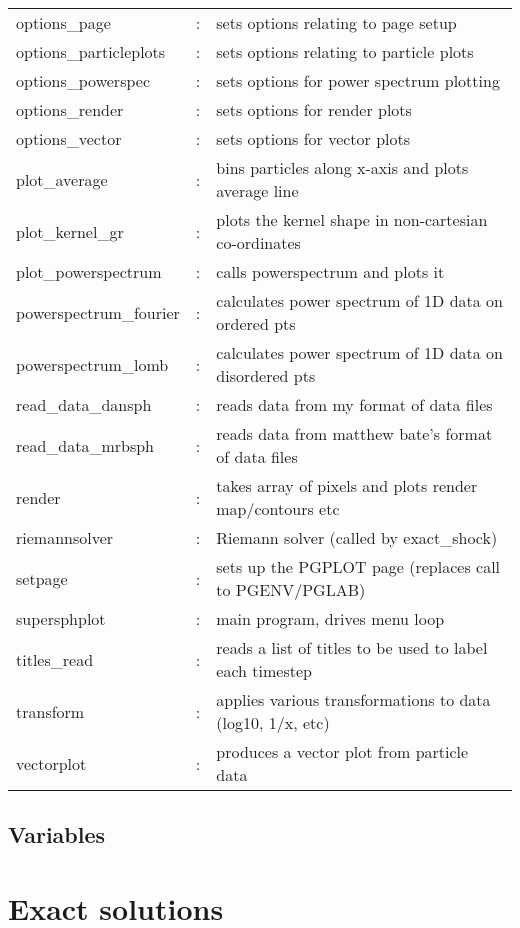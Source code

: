 \documentclass[a4paper,12pt]{article}
\begin{document}
\begin{longtable}{|lcp{}|}
options\_page       & : & sets options relating to page setup\\
options\_particleplots & : & sets options relating to particle plots\\
options\_powerspec  & : & sets options for power spectrum plotting\\
options\_render	 & : & sets options for render plots\\
options\_vector	 & : & sets options for vector plots\\
plot\_average	 & : & bins particles along x-axis and plots average line\\
plot\_kernel\_gr     & : & plots the kernel shape in non-cartesian co-ordinates\\
plot\_powerspectrum & : & calls powerspectrum and plots it\\
powerspectrum\_fourier & : & calculates power spectrum of 1D data on ordered pts\\
powerspectrum\_lomb & : & calculates power spectrum of 1D data on disordered pts\\
read\_data\_dansph   & : & reads data from my format of data files\\
read\_data\_mrbsph   & : & reads data from matthew bate's format of data files\\
render	 	 & : & takes array of pixels and plots render map/contours etc\\
riemannsolver      & : & Riemann solver (called by exact\_shock)\\
setpage            & : & sets up the PGPLOT page (replaces call to PGENV/PGLAB)\\
supersphplot	 & : & main program, drives menu loop\\
titles\_read        & : & reads a list of titles to be used to label each timestep\\
transform	 	 & : & applies various transformations to data (log10, 1/x, etc)\\
vectorplot         & : & produces a vector plot from particle data
\end{longtable}

\subsection{Variables}
\label{sec:variables}


\section{Exact solutions}
\label{sec:exact}
\end{document}
